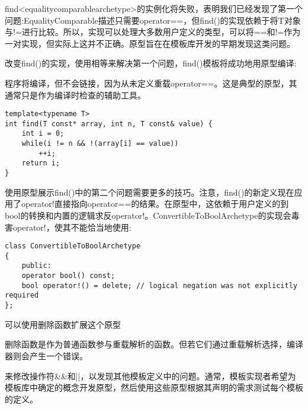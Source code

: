 find<equalitycomparablearchetype>的实例化将失败，表明我们已经发现了第一个问题:EqualityComparable描述只需要operator==，但find()的实现依赖于将T对象与!=进行比较。所以，实现可以处理大多数用户定义的类型，可以将==和!=作为一对实现，但实际上这并不正确。原型旨在在模板库开发的早期发现这类问题。

改变find()的实现，使用相等来解决第一个问题，find()模板将成功地用原型编译:

\begin{tcolorbox}[colback=webgreen!5!white,colframe=webgreen!75!black]
\hspace*{0.75cm}程序将编译，但不会链接，因为从未定义重载operator==。这是典型的原型，其通常只是作为编译时检查的辅助工具。
\end{tcolorbox}

\begin{lstlisting}[style=styleCXX]
template<typename T>
int find(T const* array, int n, T const& value) {
	int i = 0;
	while(i != n && !(array[i] == value))
		++i;
	return i;
}
\end{lstlisting}

使用原型展示find()中的第二个问题需要更多的技巧。注意，find()的新定义现在应用了operator!直接指向operator==的结果。在原型中，这依赖于用户定义的到bool的转换和内置的逻辑求反operator!。ConvertibleToBoolArchetype的实现会毒害operator!，使其不能恰当地使用:

\begin{lstlisting}[style=styleCXX]
class ConvertibleToBoolArchetype
{
	public:
	operator bool() const;
	bool operator!() = delete; // logical negation was not explicitly required
};
\end{lstlisting}

可以使用删除函数扩展这个原型

\begin{tcolorbox}[colback=webgreen!5!white,colframe=webgreen!75!black]
\hspace*{0.75cm}删除函数是作为普通函数参与重载解析的函数。但若它们通过重载解析选择，编译器则会产生一个错误。
\end{tcolorbox}

来修改操作符\&\&和||，以发现其他模板定义中的问题。通常，模板实现者希望为模板库中确定的概念开发原型，然后使用这些原型根据其声明的需求测试每个模板的定义。






















